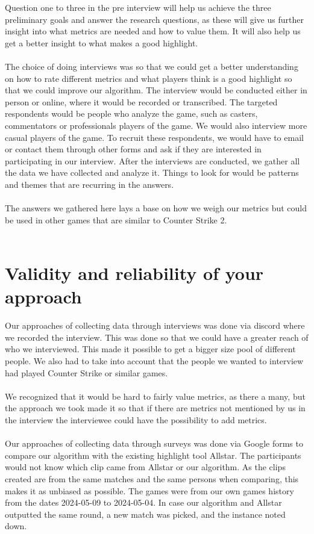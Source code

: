 Question one to three in the pre interview will help us achieve the three preliminary goals and answer the research questions, as these will give us further insight into what metrics are needed and how to value them. It will also help us get a better insight to what makes a good highlight. \\\\
The choice of doing interviews was so that we could get a better understanding on how to rate different metrics and what players think is a good highlight so that we could improve our algorithm. The interview would be conducted either in person or online, where it would be recorded or transcribed. The targeted respondents would be people who analyze the game, such as casters, commentators or professionals players of the game. We would also interview more casual players of the game. To recruit these respondents, we would have to email or contact them through other forms and ask if they are interested in participating in our interview. After the interviews are conducted, we gather all the data we have collected and analyze it. Things to look for would be patterns and themes that are recurring in the answers.\\\\
The answers we gathered here lays a base on how we weigh our metrics but could be used in other games that are similar to Counter Strike 2.\\\\ 

\section{Validity and reliability of your approach}
Our approaches of collecting data through interviews was done via discord where we recorded the interview. This was done so that we could have a greater reach of who we interviewed. This made it possible to get a bigger size pool of different people. We also had to take into account that the people we wanted to interview had played Counter Strike or similar games.\\\\ We recognized that it would be hard to fairly value metrics, as there a many, but the approach we took made it so that if there are metrics not mentioned by us in the interview the interviewee could have the possibility to add metrics.\\\\
Our approaches of collecting data through surveys was done via Google forms to compare our algorithm with the existing highlight tool Allstar. The participants would not know which clip came from Allstar or our algorithm. As the clips created are from the same matches and the same persons when comparing, this makes it as unbiased as possible. The games were from our own games history from the dates 2024-05-09 to 
2024-05-04. In case our algorithm and Allstar outputted the same round, a new match was picked, and the instance noted down. 